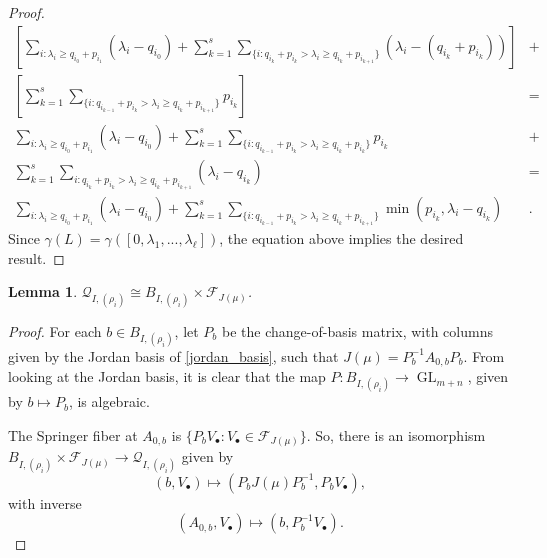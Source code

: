 \documentclass[12pt,psamsfonts]{article}
\DeclareMathOperator{\GL}{GL}
\newtheorem{lemma}[theorem]{Lemma}
\begin{document}
\begin{proof}
\begin{align*}
        \left[\sum_{i : \lambda_i \geq q_{i_0} + p_{i_1}} (\lambda_i - q_{i_0}) + \sum_{k = 1}^s \sum_{\{i : q_{i_k} + p_{i_k} > \lambda_i \geq q_{i_k} + p_{i_{k + 1}}\}} (\lambda_i - (q_{i_k} + p_{i_k}))\right] & + \\
        \left[\sum_{k = 1}^s \sum_{\{i : q_{i_{k - 1}} + p_{i_k} > \lambda_i \geq q_{i_k} + p_{i_{k + 1}}\}} p_{i_k}\right] & = \\
        \sum_{i : \lambda_i \geq q_{i_0} + p_{i_1}} (\lambda_i - q_{i_0}) + \sum_{k = 1}^s \sum_{\{i : q_{i_{k - 1}} + p_{i_k} > \lambda_i \geq q_{i_k} + p_{i_k}\}} p_{i_k} & + \\
        \sum_{k = 1}^s \sum_{i : q_{i_k} + p_{i_k} > \lambda_i \geq q_{i_k} + p_{i_{k + 1}}} (\lambda_i - q_{i_k}) & = \\
        \sum_{i : \lambda_i \geq q_{i_0} + p_{i_1}} (\lambda_i - q_{i_0}) + \sum_{k = 1}^s \sum_{\{i : q_{i_{k - 1}} + p_{i_k} > \lambda_i \geq q_{i_k} + p_{i_{k + 1}}\}} \min(p_{i_k}, \lambda_i - q_{i_k}) & .
    \end{align*}
    Since \(\gamma(L) = \gamma([0, \lambda_1, ..., \lambda_\ell])\), the equation above implies the desired result.
\end{proof}

\begin{lemma}\label{u_i_rho_iso}
    \(\mathcal{Q}_{I, (\rho_i)} \cong B_{I, (\rho_i)} \times \mathcal{F}_{J(\mu)}\).
\end{lemma}
\begin{proof}
    For each \(b \in B_{I, (\rho_i)}\), let \(P_b\) be the change-of-basis matrix, with columns given by the Jordan basis of \cref{jordan_basis}, such that \(J(\mu) = P_b^{-1} A_{0,b} P_b\).
    From looking at the Jordan basis, it is clear that the map \(P : B_{I, (\rho_i)} \to \GL_{m + n}\), given by \(b \mapsto P_b\), is algebraic.
    \par The Springer fiber at \(A_{0,b}\) is \(\{P_b V_\bullet : V_\bullet \in \mathcal{F}_{J(\mu)}\}\).
    So, there is an isomorphism \(B_{I, (\rho_i)} \times \mathcal{F}_{J(\mu)} \to \mathcal{Q}_{I, (\rho_i)}\) given by
    \[(b, V_\bullet) \mapsto (P_b J(\mu) P_b^{-1}, P_b V_\bullet),\]
    with inverse
    \[(A_{0,b}, V_\bullet) \mapsto (b, P_b^{-1} V_\bullet).\]
\end{proof}
\end{document}
